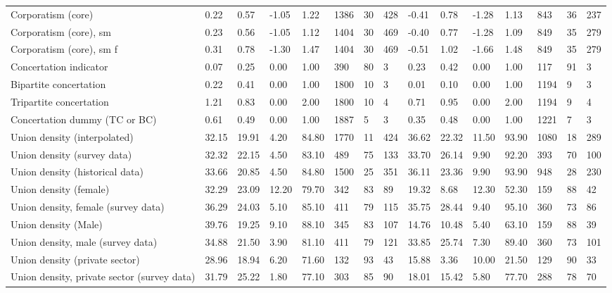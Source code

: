 \begin{longtable}{lllllllllllllll}
Corporatism (core) & 0.22 & 0.57 & -1.05 & 1.22 & 1386 & 30 & 428 & -0.41 & 0.78 & -1.28 & 1.13 & 843 & 36 & 237\\
\addlinespace
Corporatism (core), sm & 0.23 & 0.56 & -1.05 & 1.12 & 1404 & 30 & 469 & -0.40 & 0.77 & -1.28 & 1.09 & 849 & 35 & 279\\
Corporatism (core), sm f & 0.31 & 0.78 & -1.30 & 1.47 & 1404 & 30 & 469 & -0.51 & 1.02 & -1.66 & 1.48 & 849 & 35 & 279\\
Concertation indicator & 0.07 & 0.25 & 0.00 & 1.00 & 390 & 80 & 3 & 0.23 & 0.42 & 0.00 & 1.00 & 117 & 91 & 3\\
Bipartite concertation & 0.22 & 0.41 & 0.00 & 1.00 & 1800 & 10 & 3 & 0.01 & 0.10 & 0.00 & 1.00 & 1194 & 9 & 3\\
Tripartite concertation & 1.21 & 0.83 & 0.00 & 2.00 & 1800 & 10 & 4 & 0.71 & 0.95 & 0.00 & 2.00 & 1194 & 9 & 4\\
\addlinespace
Concertation dummy (TC or BC) & 0.61 & 0.49 & 0.00 & 1.00 & 1887 & 5 & 3 & 0.35 & 0.48 & 0.00 & 1.00 & 1221 & 7 & 3\\
Union density (interpolated) & 32.15 & 19.91 & 4.20 & 84.80 & 1770 & 11 & 424 & 36.62 & 22.32 & 11.50 & 93.90 & 1080 & 18 & 289\\
Union density (survey data) & 32.32 & 22.15 & 4.50 & 83.10 & 489 & 75 & 133 & 33.70 & 26.14 & 9.90 & 92.20 & 393 & 70 & 100\\
Union density (historical data) & 33.66 & 20.85 & 4.50 & 84.80 & 1500 & 25 & 351 & 36.11 & 23.36 & 9.90 & 93.90 & 948 & 28 & 230\\
Union density (female) & 32.29 & 23.09 & 12.20 & 79.70 & 342 & 83 & 89 & 19.32 & 8.68 & 12.30 & 52.30 & 159 & 88 & 42\\
\addlinespace
Union density, female (survey data) & 36.29 & 24.03 & 5.10 & 85.10 & 411 & 79 & 115 & 35.75 & 28.44 & 9.40 & 95.10 & 360 & 73 & 86\\
Union density (Male) & 39.76 & 19.25 & 9.10 & 88.10 & 345 & 83 & 107 & 14.76 & 10.48 & 5.40 & 63.10 & 159 & 88 & 39\\
Union density, male (survey data) & 34.88 & 21.50 & 3.90 & 81.10 & 411 & 79 & 121 & 33.85 & 25.74 & 7.30 & 89.40 & 360 & 73 & 101\\
Union density (private sector) & 28.96 & 18.94 & 6.20 & 71.60 & 132 & 93 & 43 & 15.88 & 3.36 & 10.00 & 21.50 & 129 & 90 & 33\\
Union density, private sector (survey data) & 31.79 & 25.22 & 1.80 & 77.10 & 303 & 85 & 90 & 18.01 & 15.42 & 5.80 & 77.70 & 288 & 78 & 70\\

\end{longtable}
